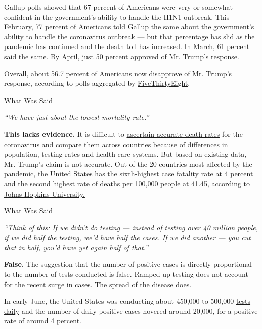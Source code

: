 Gallup polls showed that 67 percent of Americans were very or somewhat
confident in the government's ability to handle the H1N1 outbreak. This
February,
\href{https://news.gallup.com/poll/286277/high-confidence-government-handle-coronavirus.aspx}{77
percent} of Americans told Gallup the same about the government's
ability to handle the coronavirus outbreak --- but that percentage has
slid as the pandemic has continued and the death toll has increased. In
March,
\href{https://news.gallup.com/opinion/polling-matters/296681/ten-key-findings-public-opinion-coronavirus.aspx}{61
percent} said the same. By April, just
\href{https://news.gallup.com/poll/309614/health-institutions-rated-best-covid-response.aspx}{50
percent} approved of Mr. Trump's response.

Overall, about 56.7 percent of Americans now disapprove of Mr. Trump's
response, according to polls aggregated by
\href{https://projects.fivethirtyeight.com/coronavirus-polls/}{FiveThirtyEight}.

What Was Said

\emph{``We have just about the lowest mortality rate.''}

\textbf{This lacks evidence.} It is difficult to
\href{https://www.nytimes3xbfgragh.onion/2020/07/04/health/coronavirus-death-rate.html}{ascertain
accurate death rates} for the coronavirus and compare them across
countries because of differences in population, testing rates and health
care systems. But based on existing data, Mr. Trump's claim is not
accurate. Out of the 20 countries most affected by the pandemic, the
United States has the sixth-highest case fatality rate at 4 percent and
the second highest rate of deaths per 100,000 people at 41.45,
\href{https://coronavirus.jhu.edu/data/mortality}{according to Johns
Hopkins University.}

What Was Said

\emph{``Think of this: If we didn't do testing --- instead of testing
over 40 million people, if we did half the testing, we'd have half the
cases. If we did another --- you cut that in half, you'd have yet again
half of that.''}

\textbf{False.} The suggestion that the number of positive cases is
directly proportional to the number of tests conducted is false.
Ramped-up testing does not account for the recent surge in cases. The
spread of the disease does.

In early June, the United States was conducting about 450,000 to 500,000
\href{https://coronavirus.jhu.edu/testing/individual-states/usa}{tests
daily} and the number of daily positive cases hovered around 20,000, for
a positive rate of around 4 percent.

